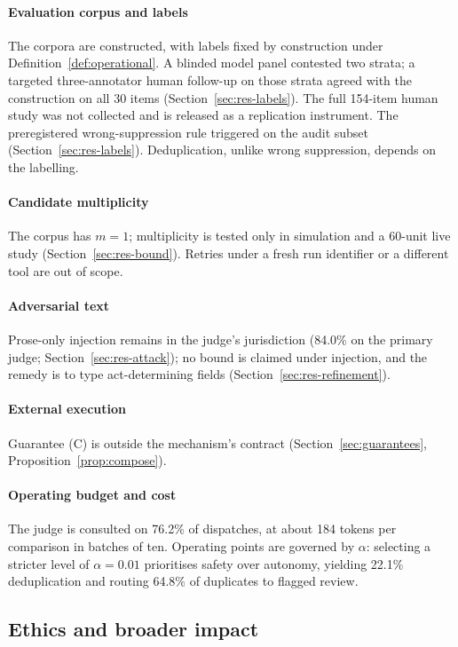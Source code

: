 \paragraph{Evaluation corpus and labels} The corpora are constructed, with labels fixed by construction under Definition~\ref{def:operational}. A blinded model panel contested two strata; a targeted three-annotator human follow-up on those strata agreed with the construction on all 30 items (Section~\ref{sec:res-labels}). The full 154-item human study was not collected and is released as a replication instrument. The preregistered wrong-suppression rule triggered on the audit subset (Section~\ref{sec:res-labels}). Deduplication, unlike wrong suppression, depends on the labelling.

\paragraph{Candidate multiplicity} The corpus has $m = 1$; multiplicity is tested only in simulation and a 60-unit live study (Section~\ref{sec:res-bound}). Retries under a fresh run identifier or a different tool are out of scope.

\paragraph{Adversarial text} Prose-only injection remains in the judge's jurisdiction (84.0\% on the primary judge; Section~\ref{sec:res-attack}); no bound is claimed under injection, and the remedy is to type act-determining fields (Section~\ref{sec:res-refinement}).

\paragraph{External execution} Guarantee (C) is outside the mechanism's contract (Section~\ref{sec:guarantees}, Proposition~\ref{prop:compose}).

\paragraph{Operating budget and cost}
The judge is consulted on 76.2\% of dispatches, at about 184 tokens per comparison in batches of ten. Operating points are governed by $\alpha$: selecting a stricter level of $\alpha=0.01$ prioritises safety over autonomy, yielding 22.1\% deduplication and routing 64.8\% of duplicates to flagged review.

\subsection{Ethics and broader impact}

